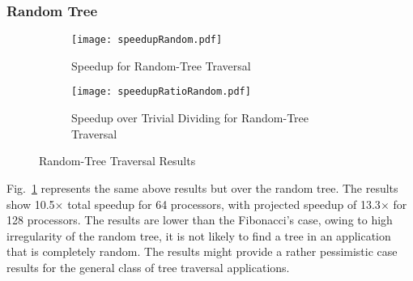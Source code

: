 \documentclass[conference,compsoc]{IEEEtran}
\begin{document}
\subsubsection{Random Tree}
\begin{figure}
	\begin{subfigure}{\columnwidth}
		\centering
		\texttt{[image: speedupRandom.pdf]}
		\caption{Speedup for Random-Tree Traversal}
	\end{subfigure}
	\begin{subfigure}{\columnwidth}
		\centering
		\texttt{[image: speedupRatioRandom.pdf]}
		\caption{Speedup over Trivial Dividing for Random-Tree Traversal}
	\end{subfigure}
	\caption{Random-Tree Traversal Results}
	\label{figRandomResults}
\end{figure}
Fig.~\ref{figRandomResults} represents the same above results but over the random tree. The results show 10.5$\times$ total speedup for 64 processors, with projected speedup of 13.3$\times$ for 128 processors. The results are lower than the Fibonacci's case, owing to high irregularity of the random tree, it is not likely to find a tree in an application that is completely random. The results might provide a rather pessimistic case results for the general class of tree traversal applications.


\end{document}
